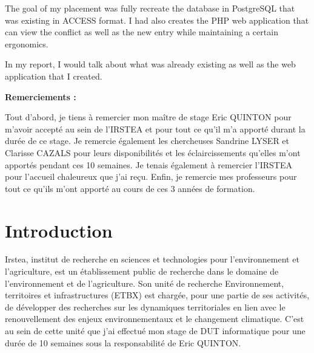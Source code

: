 \documentclass[12pt,a4paper,titlepage,twoside]{report}
\begin{document}
The goal of my placement was fully recreate the database in PostgreSQL that was existing in ACCESS format. I had also creates the PHP web application that can view the conflict as well as the new entry while maintaining a certain ergonomics. \newline

In my report, I would talk about what was already existing as well as the web application that I created.

\cleardoublepage
\vspace{1cm}
\begin{center}
\bf 
\color{titreColor}
\LARGE{Remerciements :}
\end{center}
Tout d'abord, je tiens à remercier mon maître de stage Eric QUINTON pour m'avoir accepté au sein de l'IRSTEA et pour tout ce qu'il m'a apporté durant la durée de ce stage. \newline\newline
Je remercie également les chercheuses Sandrine LYSER et Clarisse CAZALS pour leurs disponibilités et les éclaircissements qu'elles m'ont apportés pendant ces 10 semaines. \newline\newline
Je tenais également à remercier l'IRSTEA pour l'accueil chaleureux que j'ai reçu. \newline\newline
Enfin, je remercie mes professeurs pour tout ce qu'ils m'ont apporté au cours de ces 3 années de formation. 

\cleardoublepage
\setcounter{tocdepth}{4}
\tableofcontents
\clearpage
\listoffigures

\cleardoublepage
\chapter{Introduction}
Irstea, institut de recherche en sciences et technologies pour l’environnement et l’agriculture, est un établissement public de recherche dans le domaine de l’environnement et de l’agriculture. Son unité de recherche Environnement, territoires et infrastructures (ETBX) est chargée, pour une partie de ses activités, de développer des recherches sur les dynamiques territoriales en lien avec le renouvellement des enjeux environnementaux et le changement climatique. C’est au sein de cette unité que j’ai effectué mon stage de DUT informatique pour une durée de 10 semaines sous la responsabilité de Eric QUINTON. \newline
\end{document}
